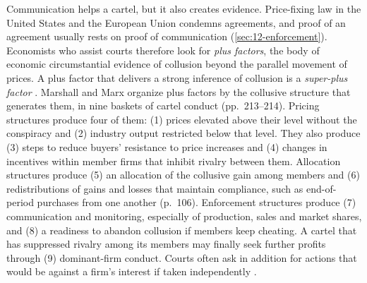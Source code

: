 Communication helps a cartel, but it also creates evidence. Price-fixing law in the United States and the European
Union condemns agreements, and proof of an agreement usually rests on proof of communication
(\cref{sec:12-enforcement}). Economists who assist courts therefore look for \emph{plus factors}, the body of
economic circumstantial evidence of collusion beyond the parallel movement of prices. A plus factor that delivers
a strong inference of collusion is a \emph{super-plus factor} \citep[p.~213]{MarshallMarx2012}. Marshall and Marx
organize plus factors by the collusive structure that generates them, in nine baskets of cartel conduct
(pp.~213--214). Pricing structures produce four of them: (1) prices elevated above their level without the
conspiracy and (2) industry output restricted below that level. They also produce (3) steps to reduce buyers'
resistance to price increases and (4) changes in incentives within member firms that inhibit rivalry between them. Allocation structures produce
(5) an allocation of the collusive gain among members and (6) redistributions of gains and losses that maintain
compliance, such as end-of-period purchases from one another (p.~106). Enforcement structures produce
(7) communication and monitoring, especially of production, sales and market shares, and (8) a readiness to
abandon collusion if members keep cheating. A cartel that has suppressed rivalry among its members may finally seek
further profits through (9) dominant-firm conduct. Courts often ask in addition for actions that would be against a
firm's interest if taken independently \citep[p.~110]{Kaplow2013}.


